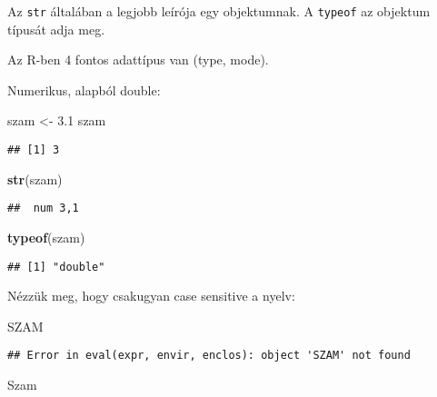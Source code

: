 \documentclass[]{book}
\newenvironment{Shaded}{\begin{snugshade}}{\end{snugshade}}
\newcommand{\FloatTok}[1]{\textcolor[rgb]{0.00,0.00,0.81}{#1}}
\newcommand{\KeywordTok}[1]{\textcolor[rgb]{0.13,0.29,0.53}{\textbf{#1}}}
\newcommand{\NormalTok}[1]{#1}
\newcommand{\StringTok}[1]{\textcolor[rgb]{0.31,0.60,0.02}{#1}}
\begin{document}
Az \texttt{str} általában a legjobb leírója egy objektumnak. A \texttt{typeof} az objektum típusát adja meg.

Az R-ben 4 fontos adattípus van (type, mode).

Numerikus, alapból double:

\begin{Shaded}
\begin{Highlighting}[]
\NormalTok{szam <-}\StringTok{ }\FloatTok{3.1}
\NormalTok{szam}
\end{Highlighting}
\end{Shaded}

\begin{verbatim}
## [1] 3
\end{verbatim}

\begin{Shaded}
\begin{Highlighting}[]
\KeywordTok{str}\NormalTok{(szam)}
\end{Highlighting}
\end{Shaded}

\begin{verbatim}
##  num 3,1
\end{verbatim}

\begin{Shaded}
\begin{Highlighting}[]
\KeywordTok{typeof}\NormalTok{(szam)}
\end{Highlighting}
\end{Shaded}

\begin{verbatim}
## [1] "double"
\end{verbatim}

Nézzük meg, hogy csakugyan case sensitive a nyelv:

\begin{Shaded}
\begin{Highlighting}[]
\NormalTok{SZAM}
\end{Highlighting}
\end{Shaded}

\begin{verbatim}
## Error in eval(expr, envir, enclos): object 'SZAM' not found
\end{verbatim}

\begin{Shaded}
\begin{Highlighting}[]
\NormalTok{Szam}
\end{Highlighting}
\end{Shaded}
\end{document}
